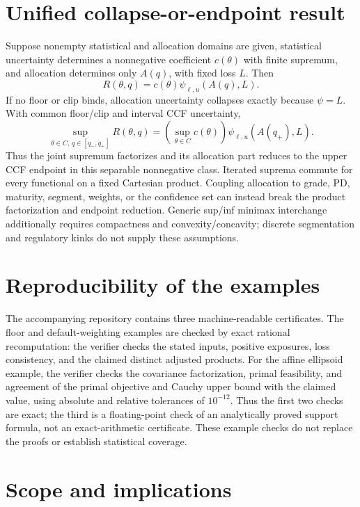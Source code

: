 \documentclass[a4paper,10pt]{article}
\begin{document}
\section{Unified collapse-or-endpoint result}

Suppose nonempty statistical and allocation domains are given, statistical uncertainty determines a nonnegative coefficient $c(\theta)$ with finite supremum, and allocation determines only $A(q)$, with fixed loss $L$. Then
\[
R(\theta,q)=c(\theta)\psi_{\ell,u}(A(q),L). \tag{12}
\]
If no floor or clip binds, allocation uncertainty collapses exactly because $\psi=L$. With common floor/clip and interval CCF uncertainty,
\[
\sup_{\theta\in C,\,q\in[q_-,q_+]}R(\theta,q)
=\left(\sup_{\theta\in C}c(\theta)\right)\psi_{\ell,u}(A(q_+),L). \tag{13}
\]
Thus the joint supremum factorizes and its allocation part reduces to the upper CCF endpoint in this separable nonnegative class. Iterated suprema commute for every functional on a fixed Cartesian product. Coupling allocation to grade, PD, maturity, segment, weights, or the confidence set can instead break the product factorization and endpoint reduction. Generic sup/inf minimax interchange additionally requires compactness and convexity/concavity; discrete segmentation and regulatory kinks do not supply these assumptions.

\section{Reproducibility of the examples}

The accompanying repository contains three machine-readable certificates. The floor and default-weighting examples are checked by exact rational recomputation: the verifier checks the stated inputs, positive exposures, loss consistency, and the claimed distinct adjusted products. For the affine ellipsoid example, the verifier checks the covariance factorization, primal feasibility, and agreement of the primal objective and Cauchy upper bound with the claimed value, using absolute and relative tolerances of $10^{-12}$. Thus the first two checks are exact; the third is a floating-point check of an analytically proved support formula, not an exact-arithmetic certificate. These example checks do not replace the proofs or establish statistical coverage.

\section{Scope and implications}
\end{document}
